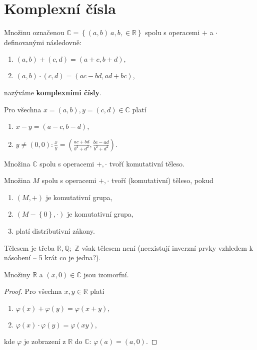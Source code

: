 \section{Komplexní čísla}
\begin{definition}\label{kompl_c_def}
Množinu označenou $\mathbb C = \left \{ (a,b)\ a,b, \in \mathbb R \right \} $
spolu s operacemi $+$ a $\cdot$ definovanými následovně:
\begin{enumerate}[$i.$]
\item $(a,b) + (c,d) = (a+c, b+d),$
\item $(a,b) \cdot (c,d) = (ac-bd, ad+bc)$,
\end{enumerate}
nazýváme \textbf{komplexními čísly}.
\end{definition}

\begin{veta}
    Pro všechna $x=(a,b),y=(c,d) \in \mathbb C$ platí
    \begin{enumerate}[$i.$]
    \item $x-y=(a-c, b-d)$,
   	\item $y\ne (0,0): \frac{x}{y}=\left ( \frac{ac+bd}{b^2+d^2}, \frac{bc-ad}{b^2+d^2} \right ) .$
    \end{enumerate}
\end{veta}

\begin{veta}
    Množina $\mathbb C$ spolu s operacemi $+,\cdot$ tvoří komutativní těleso.
\end{veta}

\begin{pozn}
    Množina $M$ spolu s operacemi $+,\cdot$ tvoří (komutativní) těleso, pokud
    \begin{enumerate}[$i.$]
    \item $(M,+)$ je komutativní grupa,
   	\item $(M-\left \{ 0 \right \} ,\cdot)$ je komutativní grupa,
   	\item platí distributivní zákony.
    \end{enumerate}
    Tělesem je třeba $\mathbb R, \mathbb Q;$ $\mathbb Z$ však tělesem není (neexistují
    inverzní prvky vzhledem k násobení -- 5 krát co je jedna?).
\end{pozn}

\begin{veta}
    Množiny $\mathbb R$ a $(x,0)\in \mathbb C$ jsou izomorfní.
\end{veta}

\begin{proof}
    Pro všechna $x,y \in \mathbb R$ platí
    \begin{enumerate}[$i.$]
    \item $\varphi(x)+\varphi(y) = \varphi(x+y),$
   	\item $\varphi(x)\cdot\varphi(y) = \varphi(xy),$
    \end{enumerate}
    kde $\varphi$ je zobrazení z $\mathbb R$ do $\mathbb C$: $\varphi(a)=(a,0).$
\end{proof}

